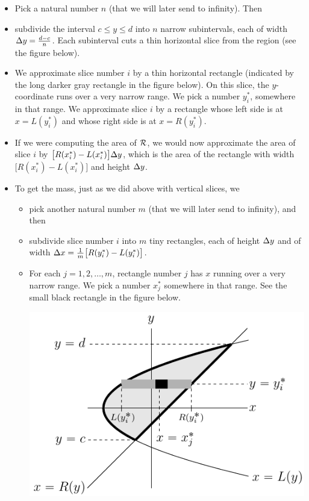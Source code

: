 \begin{itemize}
 \item 
Pick a natural number $n$ (that we will later send to infinity). Then
 \item 
subdivide the interval $c\le y\le d$ into $n$ narrow subintervals, each 
of width $\Delta y=\frac{d-c}{n}$. Each subinterval cuts a thin horizontal 
slice from the region (see the figure below).
 \item We approximate slice number $i$ by a thin horizontal rectangle (indicated by the long darker gray rectangle in the figure below). On this 
slice, the $y$-coordinate runs over a very narrow range. 
We pick a number $y_i^*$, somewhere in that range. We approximate slice 
$i$ by a rectangle whose left side is at $x=L(y_i^*)$ and whose right side 
is at $x=R(y_i^*)$.
\item 
If we were computing the area of $\mathcal{R}$, we would now
approximate the area of slice $i$ by $\big[R(x_i^*)-L(x_i^*)\big]\Delta y$,
which is the area of the rectangle with width $\big[R(x_i^*)-L(x_i^*)\big]$
and height $\Delta y$.
\item
To get the mass, just as we did above with vertical slices, we
\begin{itemize}
\item 
   pick another natural number $m$ (that we will later send to infinity), 
   and then 
\item 
   subdivide slice number $i$ into $m$ tiny rectangles, each of height $\Delta y$ 
and of width $\Delta x=\frac{1}{m}\big[R(y_i^*)-L(y_i^*)\big]$. 
\item 
For each $j=1,2,\dots,m$, rectangle number $j$ has $x$ running over a very narrow range.  We pick a number $x_j^*$ somewhere in that range. 
See the small black rectangle in the figure below.
\begin{efig}
\begin{center}
   \includegraphics{hSliceB.pdf}

\end{center}
\end{efig}
\end{itemize}
\end{itemize}
